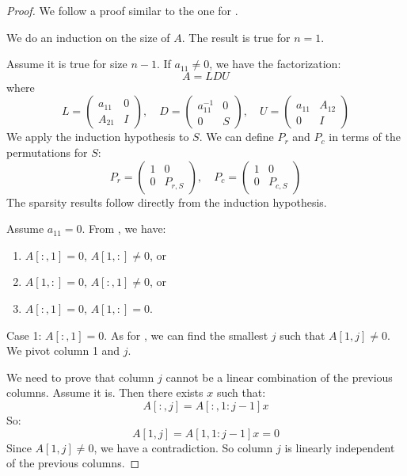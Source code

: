 \documentclass[10pt,twoside]{siamart1116}
\numberwithin{theorem}{section}
\begin{document}
\begin{proof}
	We follow a proof similar to the one for .

	We do an induction on the size of $A$. The result is true for $n=1$.

	Assume it is true for size $n-1$. If $a_{11} \neq 0$, we have the factorization:
	\[
		A = LDU
	\]
	where
	\[
		L = \begin{pmatrix}
			a_{11} & 0 \\
			A_{21} & I
		\end{pmatrix}, \quad
		D = \begin{pmatrix}
			a_{11}^{-1} & 0 \\
			0           & S
		\end{pmatrix}, \quad
		U = \begin{pmatrix}
			a_{11} & A_{12} \\
			0      & I
		\end{pmatrix}
	\]
	We apply the induction hypothesis to $S$. We can define $P_r$ and $P_c$ in terms of the permutations for $S$:
	\[ P_r = \begin{pmatrix}
			1 & 0       \\
			0 & P_{r,S}
		\end{pmatrix}, \quad
		P_c = \begin{pmatrix}
			1 & 0       \\
			0 & P_{c,S}
		\end{pmatrix}
	\]
	The sparsity results follow directly from the induction hypothesis.

	Assume $a_{11} = 0$. From , we have:
	\begin{enumerate}
		\item $A[:,1] = 0$, $A[1,:] \ne 0$, or
		\item $A[1,:] = 0$, $A[:,1] \ne 0$, or
		\item $A[:,1] = 0$, $A[1,:] = 0$.
	\end{enumerate}

	Case 1: $A[:,1] = 0$. As for , we can find the smallest $j$ such that $A[1,j] \neq 0$. We pivot column 1 and $j$.

	We need to prove that column $j$ cannot be a linear combination of the previous columns. Assume it is. Then there exists $x$ such that:
	\[ A[:,j] = A[:,1:j-1] x \]
	So:
	\[ A[1,j] = A[1,1:j-1] x = 0 \]
	Since $A[1,j] \neq 0$, we have a contradiction. So column $j$ is linearly independent of the previous columns.


\end{proof}
\end{document}
